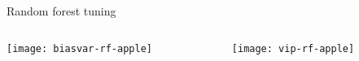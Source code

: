 \begin{frame}{Random forest tuning}

\begin{columns}[T]
\hspace*{-3.2em}\begin{column}{0.5\textwidth}
	\texttt{[image: biasvar-rf-apple]}
\end{column}
\hspace*{-1.5em}\begin{column}{0.5\textwidth}
	\texttt{[image: vip-rf-apple]}
\end{column}
\end{columns}

\end{frame}


